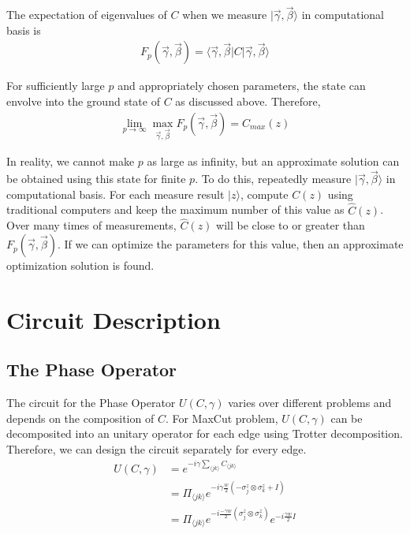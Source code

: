 \documentclass{./source/Report}
\begin{document}
The expectation of eigenvalues of $C$ when we measure $|\vec{\gamma},\vec{\beta}\rangle$ in computational basis is
\begin{align*}
    F_p(\vec{\gamma}, \vec{\beta}) = \langle\vec{\gamma},\vec{\beta}| C |\vec{\gamma},\vec{\beta}\rangle
\end{align*}

For sufficiently large $p$ and appropriately chosen parameters, the state can envolve into the ground state
of $C$ as discussed above. Therefore, 
\begin{align*}
    \lim_{p\rightarrow \infty}\max_{\vec{\gamma}, \vec{\beta}}{F_p(\vec{\gamma}, \vec{\beta})}=C_{max}(z)
\end{align*}

In reality, we cannot make $p$ as large as infinity, but an approximate solution can be obtained using this 
state for finite $p$. To do this, repeatedly measure $|\vec{\gamma}, \vec{\beta}\rangle$ in computational basis. For each measure 
result $\vert z \rangle$, compute $C(z)$ using traditional computers and keep the maximum number of this value as $\hat{C}(z)$. Over many 
times of measurements, $\hat{C}(z)$ will be close to or greater than $ F_p(\vec{\gamma}, \vec{\beta})$. If we can optimize 
the parameters for this value, then an approximate optimization solution is found.


\section{Circuit Description}

\subsection{The Phase Operator}

The circuit for the Phase Operator $U(C, \gamma)$ varies over different problems and depends on the composition of $C$. 
For MaxCut problem, $U(C, \gamma)$ can be decomposited into an unitary operator for each edge using Trotter decomposition.
Therefore, we can design the circuit separately for every edge.
\begin{align*}
    U(C, \gamma) &= e^{-i\gamma\sum_{\langle jk\rangle}C_{\langle jk\rangle}}\\
    &=\Pi_{\langle jk\rangle}e^{-i\gamma \frac{w}{2}(-\sigma_j^z\otimes\sigma_k^z+I)}\\
    &=\Pi_{\langle jk\rangle}e^{-i\frac{-\gamma w}{2}(\sigma_j^z\otimes\sigma_k^z)}e^{-i\frac{\gamma w}{2}I}
\end{align*}
\end{document}
